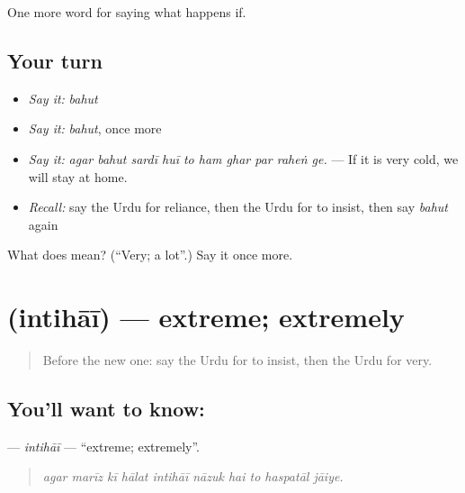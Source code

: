 \begin{grammarlens}[title={What you've built}]
One more word for saying what happens if.
\end{grammarlens}

\subsection*{Your turn}
\begin{itemize}
\raggedright
  \item \emph{Say it:} \emph{bahut}
  \item \emph{Say it:} \emph{bahut}, once more
  \item \emph{Say it:} \emph{agar bahut sardī huī to ham ghar par raheṅ ge.} — If it is very cold, we will stay at home.
  \item \emph{Recall:} say the Urdu for reliance, then the Urdu for to insist, then say \emph{bahut} again
\end{itemize}

\begin{tcolorbox}[breakable,colback=teal!4,colframe=teal!35!black,title={Before you move on}]
What does  mean? (\textquotedblleft{}Very; a lot\textquotedblright{}.) Say it once more.
\end{tcolorbox}
\section[\texorpdfstring{\ur{انتہائی} (intihāī)}{انتہائی (intihāī)}]{ (intihāī) — extreme; extremely}

\label{lesson:UR-C375-intihai}



\begin{quote}
Before the new one: say the Urdu for to insist, then the Urdu for very.
\end{quote}

\subsection*{You'll want to know: }
\textbf{} — \emph{intihāī} — \textquotedblleft{}extreme; extremely\textquotedblright{}.

\begin{quote}
         
\end{quote}

\begin{quote}
\emph{agar marīz kī hālat intihāī nāzuk hai to haspatāl jāiye.}
\end{quote}

